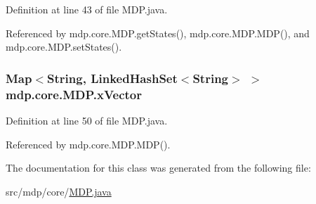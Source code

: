 Definition at line 43 of file M\+D\+P.\+java.



Referenced by mdp.\+core.\+M\+D\+P.\+get\+States(), mdp.\+core.\+M\+D\+P.\+M\+D\+P(), and mdp.\+core.\+M\+D\+P.\+set\+States().

\hypertarget{classmdp_1_1core_1_1_m_d_p_a073e9c6d6e349ae034c3cf220d754324}{}
\subsubsection[{x\+Vector}]{\setlength{\rightskip}{0pt plus 5cm}Map$<$String, Linked\+Hash\+Set$<$String$>$ $>$ mdp.\+core.\+M\+D\+P.\+x\+Vector\hspace{0.3cm}{\ttfamily [private]}}\label{classmdp_1_1core_1_1_m_d_p_a073e9c6d6e349ae034c3cf220d754324}


Definition at line 50 of file M\+D\+P.\+java.



Referenced by mdp.\+core.\+M\+D\+P.\+M\+D\+P().



The documentation for this class was generated from the following file\+:\begin{DoxyCompactItemize}
\item 
src/mdp/core/\hyperlink{_m_d_p_8java}{M\+D\+P.\+java}\end{DoxyCompactItemize}

